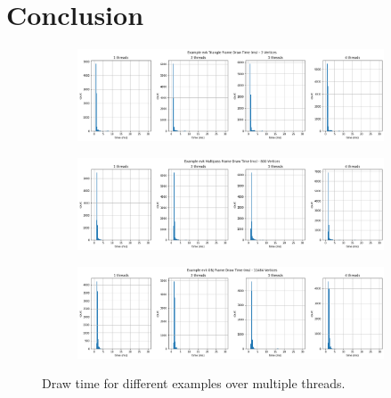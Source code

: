 \documentclass[12pt]{report}
\theoremstyle{definition}
\begin{document}
  \chapter{Conclusion}

  \afterpage
  {
    \begin{figure}
      \begin{subfigure}[b]{\textwidth}
        \includegraphics[width=\textwidth]{images/triangle_draw.png}
      \end{subfigure}
      \begin{subfigure}[b]{\textwidth}
        \includegraphics[width=\textwidth]{images/multipass_draw.png}
      \end{subfigure}
      \begin{subfigure}[b]{\textwidth}
        \includegraphics[width=\textwidth]{images/obj_draw.png}
      \end{subfigure}
      \caption{Draw time for different examples over multiple threads.}
      \label{fig:draw}                        
    \end{figure}

    \clearpage

}
\end{document}
